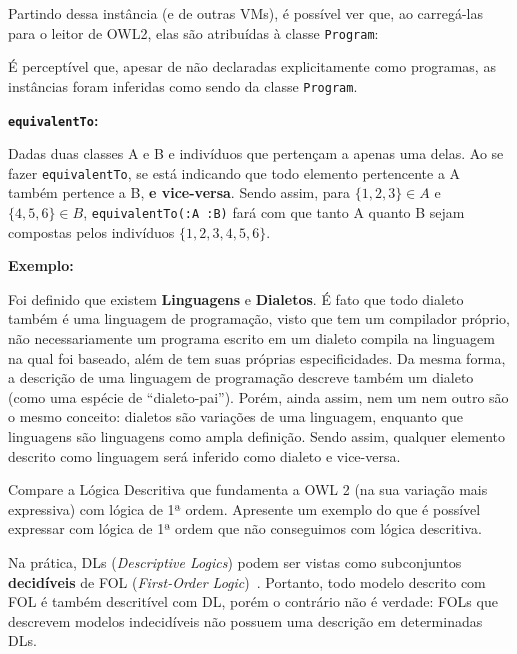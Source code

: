 \documentclass[answers]{exam}
\newcommand{\result}[2]{\textfile[firstline=#1, lastline=#2]{thesampleoutput}}
\begin{document}
\begin{questions}
\begin{answer}
            Partindo dessa instância (e de outras VMs), é possível ver que, ao
            carregá-las para o leitor de OWL2, elas são atribuídas à classe
            \texttt{Program}:

            \result{15}{17}

            É perceptível que, apesar de não declaradas explicitamente como
            programas, as instâncias foram inferidas como sendo da classe
            \texttt{Program}.

            \textbf{\texttt{equivalentTo}:}

            Dadas duas classes A e B e indivíduos que pertençam a apenas uma
            delas. Ao se fazer \texttt{equivalentTo}, se está indicando que
            todo elemento pertencente a A também pertence a B, \textbf{e
            vice-versa}.  Sendo assim, para $\{1, 2, 3\} \in A$ e $\{4, 5, 6\}
            \in B$, \texttt{equivalentTo(:A :B)} fará com que tanto A quanto B
            sejam compostas pelos indivíduos $\{1, 2, 3, 4, 5, 6\}$.

            \textbf{Exemplo:}

            Foi definido que existem \textbf{Linguagens} e \textbf{Dialetos}. É
            fato que todo dialeto também é uma linguagem de programação, visto
            que tem um compilador próprio, não necessariamente um programa
            escrito em um dialeto compila na linguagem na qual foi baseado,
            além de tem suas próprias especificidades. Da mesma forma, a
            descrição de uma linguagem de programação descreve também um
            dialeto (como uma espécie de ``dialeto-pai''). Porém, ainda assim,
            nem um nem outro são o mesmo conceito: dialetos são variações de
            uma linguagem, enquanto que linguagens são linguagens como ampla
            definição.  Sendo assim, qualquer elemento descrito como linguagem
            será inferido como dialeto e vice-versa.
        \end{answer}

        \question{}
        Compare a Lógica Descritiva que fundamenta a OWL 2 (na sua variação
        mais expressiva) com lógica de 1ª ordem. Apresente um exemplo do que é
        possível expressar com lógica de 1ª ordem que não conseguimos com
        lógica descritiva.

        \begin{answer}
            Na prática, DLs (\textit{Descriptive Logics}) podem ser vistas como
            subconjuntos \textbf{decidíveis} de FOL (\textit{First-Order
            Logic})~\cite{Tsarkov2003DLRV}. Portanto, todo modelo descrito com
            FOL é também descritível com DL, porém o contrário não é verdade:
            FOLs que descrevem modelos indecidíveis não possuem uma descrição
            em determinadas DLs.


\end{answer}
\end{questions}
\end{document}
